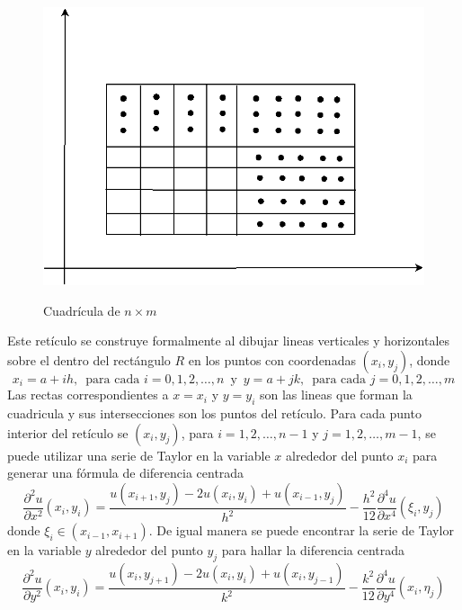 \documentclass[a4paper]{article}
\begin{document}
\begin{figure}[h]
\begin{center}\label{fig::mesh}
\includegraphics[scale=0.25]{./lattice.png} 
\end{center} 
\caption{Cuadrícula de $n\times m$}
\end{figure}
Este retículo se construye formalmente al dibujar lineas verticales y horizontales sobre el dentro del rectángulo $R$ en los puntos con coordenadas $(x_i, y_j)$, donde
\begin{equation}
x_i=a+ih,\,\,\,\text{para cada }i=0,1,2,\hdots,n\, \text{ y }\, y=a+jk,\,\,\,\text{para cada }j=0,1,2,\hdots,m
\end{equation}
Las rectas correspondientes a $x=x_i$ y $y=y_i$ son las lineas que forman la cuadricula y sus intersecciones son los puntos del retículo. Para cada punto interior del retículo se $(x_i,y_j)$, para $i=1,2,\hdots,n-1$ y $j=1,2,\hdots,m-1$, se puede utilizar una serie de Taylor en la variable $x$ alrededor del punto $x_i$ para generar una fórmula de diferencia centrada
\begin{equation}
\frac{\partial^2 u}{\partial x^2}(x_i,y_i)=\frac{u(x_{i+1},y_j)-2u(x_i,y_i)+u(x_{i-1},y_j)}{h^2}-\frac{h^2}{12}\frac{\partial^4 u}{\partial x^4}(\xi_i,y_j)
\end{equation}
donde $\xi_i \in (x_{i-1},x_{i+1})$. De igual manera se puede encontrar la serie de Taylor en la variable $y$ alrededor del punto $y_j$ para hallar la diferencia centrada
\begin{equation}
\frac{\partial^2 u}{\partial y^2}(x_i,y_i)=\frac{u(x_{i},y_{j+1})-2u(x_i,y_i)+u(x_{i},y_{j-1})}{k^2}-\frac{k^2}{12}\frac{\partial^4 u}{\partial y^4}(x_i,\eta_j)
\end{equation}
\end{document}
